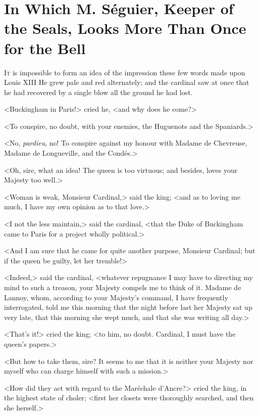 
\chapter{In Which M. Séguier, Keeper of the Seals, Looks More Than Once for the Bell}

\lettrine[]{I}{t} is impossible to form an idea of the impression these few words made upon Louis XIII He grew pale and red alternately; and the cardinal saw at once that he had recovered by a single blow all the ground he had lost. 

<Buckingham in Paris!> cried he, <and why does he come?> 

<To conspire, no doubt, with your enemies, the Huguenots and the Spaniards.> 

<No, \textit{pardieu}, no! To conspire against my honour with Madame de Chevreuse, Madame de Longueville, and the Condés.> 

<Oh, sire, what an idea! The queen is too virtuous; and besides, loves your Majesty too well.> 

<Woman is weak, Monsieur Cardinal,> said the king; <and as to loving me much, I have my own opinion as to that love.> 

<I not the less maintain,> said the cardinal, <that the Duke of Buckingham came to Paris for a project wholly political.> 

<And I am sure that he came for quite another purpose, Monsieur Cardinal; but if the queen be guilty, let her tremble!> 

<Indeed,> said the cardinal, <whatever repugnance I may have to directing my mind to such a treason, your Majesty compels me to think of it. Madame de Lannoy, whom, according to your Majesty's command, I have frequently interrogated, told me this morning that the night before last her Majesty sat up very late, that this morning she wept much, and that she was writing all day.> 

<That's it!> cried the king; <to him, no doubt. Cardinal, I must have the queen's papers.> 

<But how to take them, sire? It seems to me that it is neither your Majesty nor myself who can charge himself with such a mission.> 

<How did they act with regard to the Maréchale d'Ancre?> cried the king, in the highest state of choler; <first her closets were thoroughly searched, and then she herself.> 

